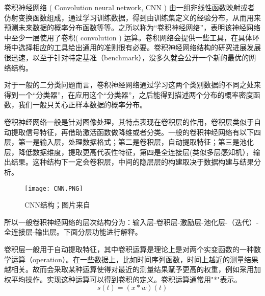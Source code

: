 卷积神经网络 ( Convolution neural network, CNN ) 由一组非线性函数映射或者仿射变换函数组成，通过学习训练数据，得到由训练集定义的经验分布，从而用来预测未来数据的概率分布函数等等。之所以称为“卷积神经网络”，表明该神经网络中至少一层使用了卷积( convolution ) 运算。卷积网络会提供一些工具，在具体环境中选择相应的工具给出通用的准则很有必要。卷积神经网络结构的研究进展发展很迅速，以至于针对特定基准（benchmark），没多久就会公开一个新的最优的网络结构。

对于一般的二分类问题而言，卷积神经网络通过学习这两个类别数据的不同之处来得到一个“分类器”，在应用这个“分类器”，之后能得到描述两个分布的概率密度函数，我们一般只关心正样本数据的概率分布。






卷积神经网络一般是针对图像处理，其特点表现在卷积层的作用，卷积层类似于自动提取信号特征，再借助激活函数做降维或者分类。一般的卷积神经网络有以下四层，第一是输入层，处理数据格式；第二是卷积层，自动提取特征；第三是池化层，降低数据维度，提取更高代表性特征，第四是全连接层(类似多层感知机），输出结果。这种结构下一定会卷积层，中间的隐层层的构建取决于数据构建与结果分析。

\begin{figure}[htbp]
\begin{center}
\texttt{[image: CNN.PNG]}
\caption{CNN结构；图片来自\cite{zaccone2018deep}}
\label{fig3-CNN}
\end{center}
\end{figure}

所以一般卷积神经网络的层次结构分为：输入层-卷积层-激励层-池化层-（迭代）-全连接层-输出层。下面分层功能进行解释。

卷积层一般用于自动提取特征，其中卷积运算是理论上是对两个实变函数的一种数学运算（operation）。在一些数据上，比如时间序列函数，时间上越近的测量结果越相关。故而会采取某种运算使得对最近的测量结果赋予更高的权重，例如采用加权平均操作。实现这种运算可以得到卷积的定义。卷积运算通常用"*"表示。
$$s(t)=(x*w)(t)$$

